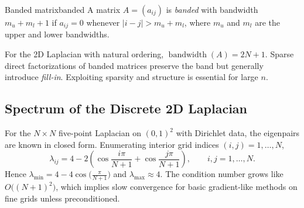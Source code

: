 \documentclass[../../main.tex]{subfiles}
\begin{document}
\begin{definition}{Banded matrix}{banded}
    A matrix $A=(a_{ij})$ is \emph{banded} with bandwidth $m_u+m_l+1$ if $a_{ij}=0$ whenever $|i-j|>m_u+m_l$, where $m_u$ and $m_l$ are the upper and lower bandwidths.
\end{definition}

For the 2D Laplacian with natural ordering, $\operatorname{bandwidth}(A)=2N+1$. Sparse direct factorizations of banded matrices preserve the band but generally introduce \emph{fill-in}. Exploiting sparsity and structure is essential for large $n$.

\subsection{Spectrum of the Discrete 2D Laplacian}
For the $N\times N$ five-point Laplacian on $(0,1)^2$ with Dirichlet data, the eigenpairs are known in closed form. Enumerating interior grid indices $(i,j)=1,\dots,N$,
\[
    \lambda_{ij} = 4 - 2\left(\cos\frac{i\pi}{N+1} + \cos\frac{j\pi}{N+1}\right),\qquad i,j=1,\dots,N.
\]
Hence $\lambda_{\min}=4-4\cos\bigl(\tfrac{\pi}{N+1}\bigr)$ and $\lambda_{\max}\approx 4$. The condition number grows like $O\big((N+1)^2\big)$, which implies slow convergence for basic gradient-like methods on fine grids unless preconditioned.
\end{document}
